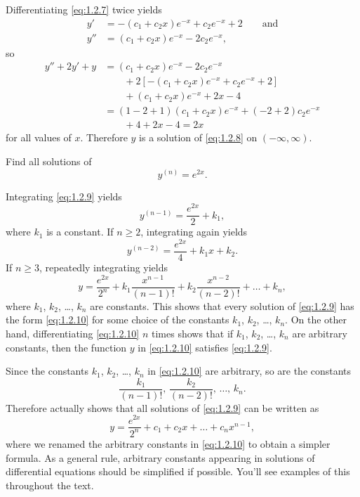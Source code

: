 \begin{solution}
Differentiating \eqref{eq:1.2.7} twice yields
\begin{align*}
y'&=-(c_1+c_2x)e^{-x}+c_2e^{-x}+2\qquad\text{and}\\
y''&=(c_1+c_2x)e^{-x}-2c_2e^{-x},
\end{align*}
so
\begin{align*}
y''+2y'+y&=(c_1+c_2x)e^{-x}-2c_2e^{-x}\\
&\qquad{}+2\left[-(c_1+c_2x)e^{-x}+c_2e^{-x}+2\right]\\
&\qquad{}+(c_1+c_2x)e^{-x}+2x-4\\
&=(1-2+1)(c_1+c_2x)e^{-x}+(-2+2)c_2e^{-x}\\
&\qquad{}+4+2x-4=2x
\end{align*}
for all values of $x$.
Therefore $y$ is a solution of \eqref{eq:1.2.8} on $(-\infty,\infty)$.
\end{solution}

\begin{example}\label{example:1.2.4}
Find all solutions of
\begin{equation} \label{eq:1.2.9}
y^{(n)}=e^{2x}.
\end{equation}
\end{example}

\begin{solution}
Integrating \eqref{eq:1.2.9} yields
\[
y^{(n-1)}=\frac{e^{2x}}{2}+k_1,
\]
 where $k_1$ is a constant. If $n\ge2$,
integrating again yields
\[
y^{(n-2)}=\frac{e^{2x}}{4}+k_1x+k_2.
\]
If $n\ge3$, repeatedly integrating yields
\begin{equation} \label{eq:1.2.10}
y=\frac{e^{2x}}{2^n}+k_1\frac{x^{n-1}}{(n-1)!}+k_2\frac{x^{n-2}}{(n-2)!}+\dots+k_n,
\end{equation}
 where $k_1$, $k_2$, \dots, $k_n$ are constants.
This shows that every solution of \eqref{eq:1.2.9} has the form
\eqref{eq:1.2.10}
for some choice of the constants $k_1$, $k_2$, \dots, $k_n$.
On the other hand, differentiating \eqref{eq:1.2.10}  $n$ times shows
that if
$k_1$, $k_2$, \dots, $k_n$ are arbitrary constants, then the function $y$
in
\eqref{eq:1.2.10} satisfies \eqref{eq:1.2.9}.

Since the constants $k_1$, $k_2$, \dots, $k_n$  in \eqref{eq:1.2.10}
are arbitrary, so are the constants
\[\frac{k_1}{(n-1)!},\, \frac{k_2}{(n-2)!},\, \dots, \, k_n.\]
 Therefore  actually shows that all
solutions of \eqref{eq:1.2.9}  can be written as
\[
y=\frac{e^{2x}}{2^n}+c_1+c_2x+\dots+c_nx^{n-1},
\]
 where we  renamed the arbitrary constants in
\eqref{eq:1.2.10} to obtain a simpler formula. As a
general rule, arbitrary constants appearing in solutions  of differential
equations should be simplified if possible. You'll see examples
of this throughout the text.
\end{solution}


